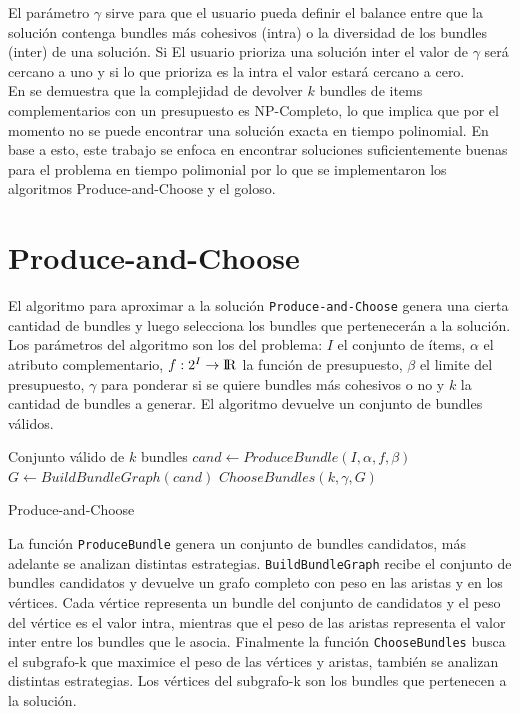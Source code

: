 El parámetro $\gamma$ sirve para que el usuario pueda definir el balance entre que la solución contenga bundles más cohesivos (intra) o la diversidad de los bundles (inter) de una solución. Si El usuario prioriza una solución inter el valor de $\gamma$ será cercano a uno y si lo que prioriza es la intra el valor estará cercano a cero.\\
En \cite{compositeRetrival} se demuestra que la complejidad de devolver $k$ bundles de items complementarios con un presupuesto es NP-Completo, lo que implica que por el momento no se puede encontrar una solución exacta en tiempo polinomial. En base a esto, este trabajo se enfoca en encontrar soluciones suficientemente buenas para el problema en tiempo polimonial por lo que se implementaron los algoritmos Produce-and-Choose y el goloso.

\section{Produce-and-Choose}
El algoritmo para aproximar a la solución \texttt{Produce-and-Choose} genera una cierta cantidad de bundles y luego selecciona los bundles que pertenecerán a la solución.\\

Los parámetros del algoritmo son los del problema: $I$ el conjunto de ítems, $\alpha$ el atributo complementario, $f: 2^{I} \rightarrow \rm I \!R$ la función de presupuesto, $\beta$ el limite del presupuesto, $\gamma$ para ponderar si se quiere bundles más cohesivos o no y $k$ la cantidad de bundles a generar. El algoritmo devuelve un conjunto de bundles válidos.\\
\begin{algorithm}[H]
\begin{algorithmic}[1]
\ENSURE Conjunto válido de $k$ bundles
\STATE $cand \leftarrow ProduceBundle(I,\alpha,f,\beta)$
\STATE $G \leftarrow BuildBundleGraph(cand)$
\RETURN $ChooseBundles(k,\gamma,G)$
\end{algorithmic}
\caption{Produce-and-Choose}\label{alg:PAC}
\end{algorithm}

La función \texttt{ProduceBundle} genera un conjunto de bundles candidatos, más adelante se analizan distintas estrategias. \texttt{BuildBundleGraph} recibe el conjunto de bundles candidatos y devuelve un grafo completo con peso en las aristas y en los vértices. Cada vértice representa un bundle del conjunto de candidatos y el peso del vértice es el valor intra, mientras que el peso de las aristas representa el valor inter entre los bundles que le asocia. Finalmente la función \texttt{ChooseBundles} busca el subgrafo-k que maximice el peso de las vértices y aristas, también se analizan distintas estrategias. Los vértices del subgrafo-k son los bundles que pertenecen a la solución.

